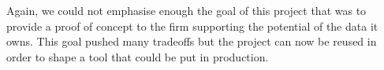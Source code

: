 \vspace{\baselineskip} 
Again, we could not emphasise enough the goal of this project that was to provide a proof of concept to the firm supporting the potential of the data it owns. This goal pushed many tradeoffs but the project can now be reused in order to shape a tool that could be put in production. 










